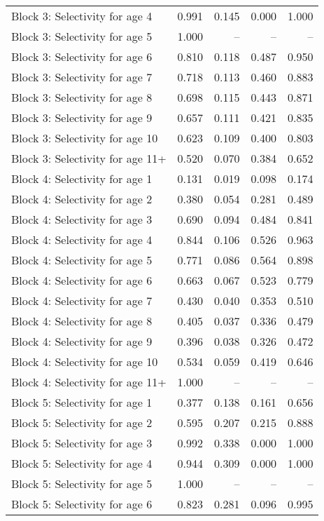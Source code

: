 \documentclass[
]{article}
\begin{document}
\begin{landscape}
\begin{longtable}[t]{lrrrr}
\addlinespace
Block 3: Selectivity for age 4 & 0.991 & 0.145 & 0.000 & 1.000\\
Block 3: Selectivity for age 5 & 1.000 & -- & -- & --\\
Block 3: Selectivity for age 6 & 0.810 & 0.118 & 0.487 & 0.950\\
Block 3: Selectivity for age 7 & 0.718 & 0.113 & 0.460 & 0.883\\
Block 3: Selectivity for age 8 & 0.698 & 0.115 & 0.443 & 0.871\\
\addlinespace
Block 3: Selectivity for age 9 & 0.657 & 0.111 & 0.421 & 0.835\\
Block 3: Selectivity for age 10 & 0.623 & 0.109 & 0.400 & 0.803\\
Block 3: Selectivity for age 11+ & 0.520 & 0.070 & 0.384 & 0.652\\
Block 4: Selectivity for age 1 & 0.131 & 0.019 & 0.098 & 0.174\\
Block 4: Selectivity for age 2 & 0.380 & 0.054 & 0.281 & 0.489\\
\addlinespace
Block 4: Selectivity for age 3 & 0.690 & 0.094 & 0.484 & 0.841\\
Block 4: Selectivity for age 4 & 0.844 & 0.106 & 0.526 & 0.963\\
Block 4: Selectivity for age 5 & 0.771 & 0.086 & 0.564 & 0.898\\
Block 4: Selectivity for age 6 & 0.663 & 0.067 & 0.523 & 0.779\\
Block 4: Selectivity for age 7 & 0.430 & 0.040 & 0.353 & 0.510\\
\addlinespace
Block 4: Selectivity for age 8 & 0.405 & 0.037 & 0.336 & 0.479\\
Block 4: Selectivity for age 9 & 0.396 & 0.038 & 0.326 & 0.472\\
Block 4: Selectivity for age 10 & 0.534 & 0.059 & 0.419 & 0.646\\
Block 4: Selectivity for age 11+ & 1.000 & -- & -- & --\\
Block 5: Selectivity for age 1 & 0.377 & 0.138 & 0.161 & 0.656\\
\addlinespace
Block 5: Selectivity for age 2 & 0.595 & 0.207 & 0.215 & 0.888\\
Block 5: Selectivity for age 3 & 0.992 & 0.338 & 0.000 & 1.000\\
Block 5: Selectivity for age 4 & 0.944 & 0.309 & 0.000 & 1.000\\
Block 5: Selectivity for age 5 & 1.000 & -- & -- & --\\
Block 5: Selectivity for age 6 & 0.823 & 0.281 & 0.096 & 0.995\\

\end{longtable}
\end{landscape}
\end{document}
